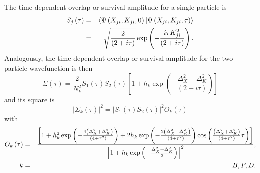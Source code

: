 \documentclass[preprint,aps]{revtex4}
\begin{document}
The time-dependent overlap or survival amplitude for a single particle is%
\begin{eqnarray}
S_{j}\left( \tau \right) &=&\langle \Psi \left( X_{ji},K_{ji},0\right) |\Psi
\left( X_{ji},K_{ji},\tau \right) \rangle  \notag \\
&=&\sqrt{\frac{2}{\left( 2+i\tau \right) }}\exp \left( -\frac{i\tau
K_{ji}^{2}}{\left( 2+i\tau \right) }\right) . \label{2.32}
\end{eqnarray}%
Analogously, the time-dependent overlap or survival amplitude for the two particle wavefunction is then
\begin{equation*}
\Sigma \left( \tau \right) =\frac{2}{N_{k}^{2}}S_{1}\left( \tau \right)
S_{2}\left( \tau \right) \left[ 1+h_{k}\exp \left( -\frac{\Delta
_{X}^{2}+\Delta _{K}^{2}}{\left( 2+i\tau \right) }\right) \right]
\end{equation*}%
and its square is%
\begin{equation}
\left\vert \Sigma _{k}\left( \tau \right) \right\vert ^{2}=\left\vert
S_{1}\left( \tau \right) S_{2}\left( \tau \right) \right\vert
^{2}O_{k}\left( \tau \right)  \label{2.33}
\end{equation}%
with
\begin{eqnarray}
O_{k}\left( \tau \right) & =&\frac{\left[ 1+h_{k}^{2}\exp \left( -\frac{%
4\left( \Delta _{X}^{2}+\Delta _{K}^{2}\right) }{\left( 4+\tau ^{2}\right) }%
\right) +2h_{k}\exp \left( -\frac{2\left( \Delta _{X}^{2}+\Delta
_{K}^{2}\right) }{\left( 4+\tau ^{2}\right) }\right) \cos \left( \frac{%
\left( \Delta _{X}^{2}+\Delta _{K}^{2}\right) }{\left( 4+\tau ^{2}\right) }%
\tau \right) \right] }{\left[ 1+h_{k}\exp \left( -\frac{\Delta
_{X}^{2}+\Delta _{K}^{2}}{2}\right) \right] ^{2}},  \notag \\
k&=&B,F,D.  \label{2.34}
\end{eqnarray}
\end{document}
